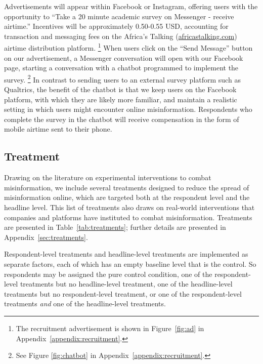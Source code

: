\documentclass[letterpaper, 12pt, parskip=full,DIV=10]{scrartcl}
\begin{document}
Advertisements will appear within Facebook or Instagram, offering users with the opportunity to ``Take a 20 minute academic survey on Messenger - receive airtime.'' Incentives will be approximately 0.50-0.55 USD, accounting for transaction and messaging fees on the  Africa's Talking (\href{https://africastalking.com/}{africastalking.com}) airtime distribution platform.%
\footnote{The recruitment advertisement is shown in Figure~\ref{fig:ad} in Appendix~\ref{appendix:recruitment}.} %
 When users click on the ``Send Message'' button on our advertisement, a Messenger conversation will open with our Facebook page, starting a conversation with a chatbot programmed to implement the survey.%
 \footnote{See Figure \ref{fig:chatbot} in Appendix~\ref{appendix:recruitment}.} %
 In contrast to sending users to an external survey platform such as Qualtrics, the benefit of the chatbot is that we keep users on the Facebook platform, with which they are likely more familiar, and maintain a realistic setting in which users might encounter online misinformation.  Respondents who complete the survey in the chatbot will receive compensation in the form of mobile airtime sent to their phone. 




\subsection{Treatment}
Drawing on the literature on experimental interventions to combat misinformation, we include several treatments designed to reduce the spread of misinformation online, which are targeted both at the respondent level and the headline level. This list of treatments also draws on real-world interventions that companies and platforms have instituted to combat misinformation. Treatments are presented in Table~\ref{tab:treatments}; further details are presented in Appendix~\ref{sec:treatments}. 

Respondent-level treatments and headline-level treatments are implemented as separate factors, each of which has an empty baseline level that is the control. So respondents may be assigned the pure control condition, one of the respondent-level treatments but no headline-level treatment, one of the headline-level treatments but no respondent-level treatment, or one of the respondent-level treatments \textit{and} one of the headline-level treatments.
\end{document}

